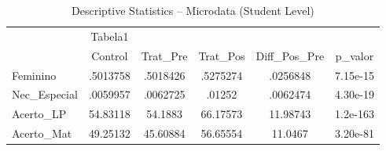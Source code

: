 ﻿\begin{table}[htbp]\centering
\caption{Descriptive Statistics -- Microdata (Student Level)}
\begin{tabular}{l*{5}{c}}
\toprule
            &     Tabela1&            &            &            &            \\
            &    Control&    Trat\_Pre&    Trat\_Pos&Diff\_Pos\_Pre&     p\_valor\\
\midrule
Feminino    &    .5013758&    .5018426&    .5275274&    .0256848&    7.15e-15\\
Nec\_Especial&    .0059957&    .0062725&      .01252&    .0062474&    4.30e-19\\
Acerto\_LP   &    54.83118&     54.1883&    66.17573&    11.98743&    1.2e-163\\
Acerto\_Mat  &    49.25132&    45.60884&    56.65554&     11.0467&    3.20e-81\\
\bottomrule
\end{tabular}
\end{table}


